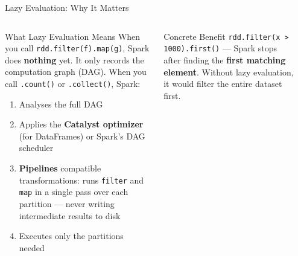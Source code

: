 \documentclass[aspectratio=169,10pt]{beamer}
\begin{document}
\begin{frame}{Lazy Evaluation: Why It Matters}
  \begin{columns}[T]
      \begin{block}{What Lazy Evaluation Means}
        When you call \texttt{rdd.filter(f).map(g)}, Spark does \textbf{nothing} yet.  It only records the computation graph (DAG).  When you call \texttt{.count()} or \texttt{.collect()}, Spark:
        \begin{enumerate}
          \item Analyses the full DAG
          \item Applies the \textbf{Catalyst optimizer} (for DataFrames) or Spark's DAG scheduler
          \item \textbf{Pipelines} compatible transformations: runs \texttt{filter} and \texttt{map} in a single pass over each partition — never writing intermediate results to disk
          \item Executes only the partitions needed
        \end{enumerate}
      \end{block}
      \vspace{4pt}
      \begin{alertblock}{Concrete Benefit}
        \small \texttt{rdd.filter(x > 1000).first()} — Spark stops after finding the \textbf{first matching element}.  Without lazy evaluation, it would filter the entire dataset first.
      \end{alertblock}

      \begin{center}
\end{center}
\end{columns}
\end{frame}
\end{document}
